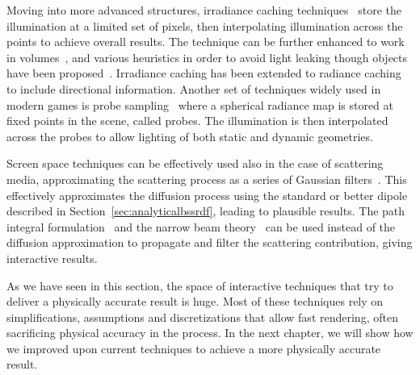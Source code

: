 Moving into more advanced structures, irradiance caching techniques~\cite{Ward1988, Tole2002} store the illumination at a limited set of pixels, then interpolating illumination across the points to achieve overall results. The technique can be further enhanced to work in volumes~\cite{Greger1998}, and various heuristics in order to avoid light leaking though objects have been proposed~\cite{Gautron2009}. Irradiance caching has been extended to radiance caching to include directional information. Another set of techniques widely used in modern games is probe sampling~\cite{Levoy1996,Hooker2016, McGuire2017,Silvennoinen2017} where a spherical radiance map is stored at fixed points in the scene, called probes. The illumination is then interpolated across the probes to allow lighting of both static and dynamic geometries. 

Screen space techniques can be effectively used also in the case of scattering media, approximating the scattering process as a series of Gaussian filters~\cite{dEon2011, Jimenez2015}. This effectively approximates the diffusion process using the standard or better dipole described in Section~\ref{sec:analyticalbssrdf}, leading to plausible results. The path integral formulation~\cite{Premoze2003, Hegeman2005} and the narrow beam theory~\cite{Shinya2016} can be used instead of the diffusion approximation to propagate and filter the scattering contribution, giving interactive results.

As we have seen in this section, the space of interactive techniques that try to deliver a physically accurate result is huge. Most of these techniques rely on simplifications, assumptions and discretizations that allow fast rendering, often sacrificing physical accuracy in the process. In the next chapter, we will show how we improved upon current techniques to achieve a more physically accurate result.
